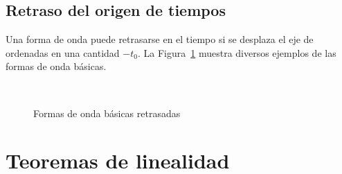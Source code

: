 \subsection{Retraso del origen de tiempos}
Una forma de onda puede retrasarse en el tiempo si se desplaza el eje
de ordenadas en una cantidad $-t_0$. La Figura~\ref{fig:retraso}
muestra diversos ejemplos de las formas de onda básicas.
\begin{figure}[H]
  \centering {}\hfil
  \\
  \hfil
  \caption{Formas de onda básicas retrasadas}
  \label{fig:retraso}
\end{figure}
	
	
\section{Teoremas de linealidad}
	
